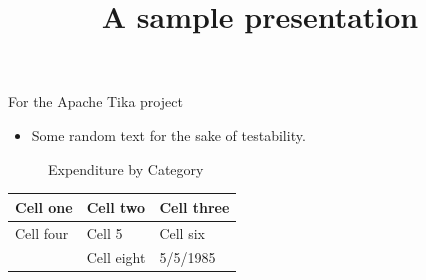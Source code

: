 \documentclass[11pt,a4paper]{article}
\title{A sample presentation}
\begin{document}
\maketitle

For the Apache Tika project

\begin{itemize}
\item Some random text for the sake of testability.
\end{itemize}

\begin{figure}[h]
\caption{Expenditure by Category}
\end{figure}

\begin{table}[h]
\begin{tabular}{|l|l|l|}
\hline
Cell one & Cell two & Cell three \\ \hline
Cell four & Cell 5 & Cell six \\ \hline
 & Cell eight & 5/5/1985 \\ \hline
\end{tabular}
\end{table}
\end{document}
